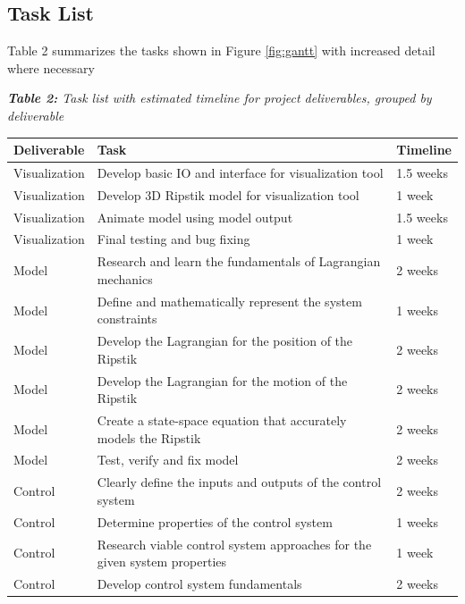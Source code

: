 \subsection{Task List}
Table 2 summarizes the tasks shown in Figure \ref{fig:gantt} with increased detail where necessary
\begin{center}
\textit{\textbf{Table 2:} Task list with estimated timeline for project deliverables, grouped by deliverable}
  \begin{tabular}{|p{2.3cm}|p{10.5cm}|p{2cm}|}
    \hline
    \textbf{Deliverable} & \textbf{Task} & \textbf{Timeline} \\ \hline Visualization &
Develop basic IO and interface for visualization tool & 1.5 weeks\\ \hline Visualization &
Develop 3D Ripstik model for visualization tool & 1 week\\
 \hline Visualization &
Animate model using model output & 1.5 weeks\\
\hline  Visualization &
Final testing and bug fixing & 1 week\\
\hline Model &
Research and learn the fundamentals of Lagrangian mechanics & 2 weeks\\ \hline Model &
Define and mathematically represent the system constraints & 1 weeks\\
\hline Model &
Develop the Lagrangian for the position of the Ripstik & 2 weeks\\
\hline Model &
Develop the Lagrangian for the motion of the Ripstik & 2 weeks\\
\hline Model &
Create a state-space equation that accurately models the Ripstik & 2 weeks\\


\hline Model &
Test, verify and fix model & 2 weeks\\
\hline Control &
Clearly define the inputs and outputs of the control system & 2 weeks\\
\hline Control &
Determine properties of the control system & 1 weeks\\
\hline Control &
Research viable control system approaches for the given system properties & 1 week\\

\hline Control &
Develop control system fundamentals & 2 weeks\\


\end{tabular}
\end{center}
